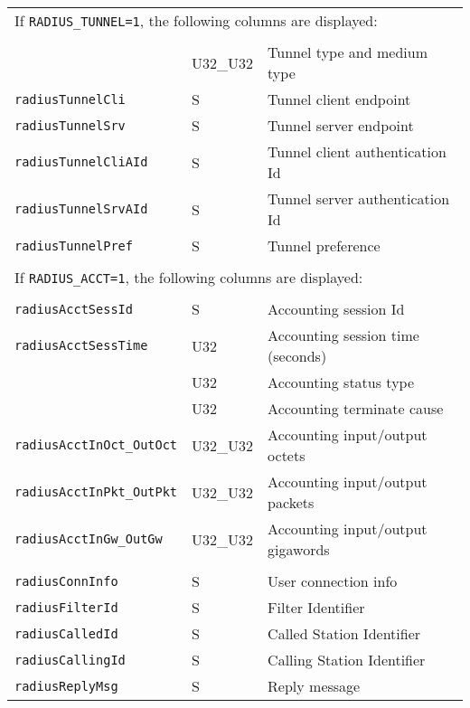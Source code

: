 \documentclass[documentation]{subfiles}
\begin{document}
\begin{longtable}{lll}
    \multicolumn{3}{l}{If {\tt RADIUS\_TUNNEL=1}, the following columns are displayed:}\\\\

    {\tt \nameref{radiusTunnelMedium}} & U32\_U32 & Tunnel type and medium type\\
    {\tt radiusTunnelCli}    & S & Tunnel client endpoint\\
    {\tt radiusTunnelSrv}    & S & Tunnel server endpoint\\
    {\tt radiusTunnelCliAId} & S & Tunnel client authentication Id\\
    {\tt radiusTunnelSrvAId} & S & Tunnel server authentication Id\\
    {\tt radiusTunnelPref}   & S & Tunnel preference\\\\

    \multicolumn{3}{l}{If {\tt RADIUS\_ACCT=1}, the following columns are displayed:}\\\\

    {\tt radiusAcctSessId}   & S & Accounting session Id\\
    {\tt radiusAcctSessTime} & U32 & Accounting session time (seconds)\\
    {\tt \nameref{radiusAcctStatTyp}} & U32 & Accounting status type\\
    {\tt \nameref{radiusAcctTerm}}    & U32 & Accounting terminate cause\\
    {\tt radiusAcctInOct\_OutOct} & U32\_U32 & Accounting input/output octets\\
    {\tt radiusAcctInPkt\_OutPkt} & U32\_U32 & Accounting input/output packets\\
    {\tt radiusAcctInGw\_OutGw}   & U32\_U32 & Accounting input/output gigawords\\\\

    {\tt radiusConnInfo}  & S & User connection info\\
    {\tt radiusFilterId}  & S & Filter Identifier\\
    {\tt radiusCalledId}  & S & Called Station Identifier\\
    {\tt radiusCallingId} & S & Calling Station Identifier\\
    {\tt radiusReplyMsg}  & S & Reply message\\
    \bottomrule
\end{longtable}
\end{document}
